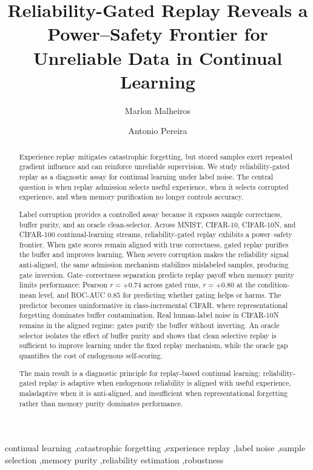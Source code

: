 \documentclass[preprint,12pt]{elsarticle}
\begin{document}
\begin{frontmatter}

\title{Reliability-Gated Replay Reveals a Power--Safety Frontier for Unreliable Data in Continual Learning}

\author[inst1]{Marlon Malheiros}

\author[inst1]{Antonio Pereira}

\address[inst1]{Signal Processing Laboratory, Universidade Federal do Par\'a (UFPA), 66075-110 Bel\'em, PA, Brazil}

\begin{abstract}
Experience replay mitigates catastrophic forgetting, but stored samples exert repeated gradient influence and can reinforce unreliable supervision. We study reliability-gated replay as a diagnostic assay for continual learning under label noise. The central question is when replay admission selects useful experience, when it selects corrupted experience, and when memory purification no longer controls accuracy.

Label corruption provides a controlled assay because it exposes sample correctness, buffer purity, and an oracle clean-selector. Across MNIST, CIFAR-10, CIFAR-10N, and CIFAR-100 continual-learning streams, reliability-gated replay exhibits a power--safety frontier. When gate scores remain aligned with true correctness, gated replay purifies the buffer and improves learning. When severe corruption makes the reliability signal anti-aligned, the same admission mechanism stabilizes mislabeled samples, producing gate inversion. Gate--correctness separation predicts replay payoff when memory purity limits performance: Pearson $r=+0.74$ across gated runs, $r=+0.80$ at the condition-mean level, and ROC-AUC $0.85$ for predicting whether gating helps or harms. The predictor becomes uninformative in class-incremental CIFAR, where representational forgetting dominates buffer contamination. Real human-label noise in CIFAR-10N remains in the aligned regime: gates purify the buffer without inverting. An oracle selector isolates the effect of buffer purity and shows that clean selective replay is sufficient to improve learning under the fixed replay mechanism, while the oracle gap quantifies the cost of endogenous self-scoring.

The main result is a diagnostic principle for replay-based continual learning: reliability-gated replay is adaptive when endogenous reliability is aligned with useful experience, maladaptive when it is anti-aligned, and insufficient when representational forgetting rather than memory purity dominates performance.
\end{abstract}

\begin{keyword}
continual learning \sep catastrophic forgetting \sep experience replay \sep label noise \sep sample selection \sep memory purity \sep reliability estimation \sep robustness
\end{keyword}

\end{frontmatter}
\end{document}
